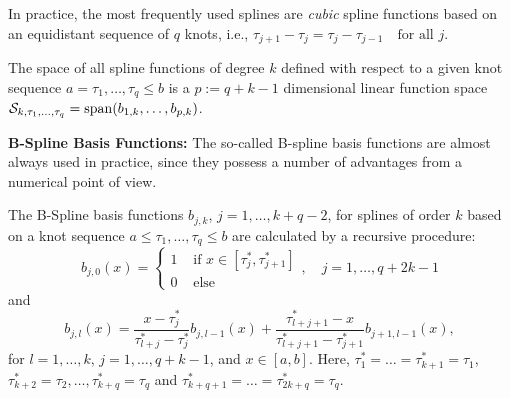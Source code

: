 \documentclass[14pt]{extreport}\usepackage[]{graphicx}\usepackage[]{xcolor}
\begin{document}
\bigskip

In practice, the most frequently used splines are \emph{cubic} spline functions based on an equidistant sequence of $q$ knots, i.e.,
$\tau_{j+1}-\tau_j=\tau_j-\tau_{j-1}\quad\text{for all } j$.

\bigskip

The space of all spline functions of degree $k$ defined with respect to a given knot sequence
$a=\tau_1,\dots,\tau_q\le b$ is a $p:=q+k-1$ dimensional linear function space
${\cal{S}}_{k,\tau_1,\dots,\tau_q}=\operatorname{span}(b_{1,k},\dots,b_{p,k})$.

% 
% 

\bigskip

\textbf{B-Spline Basis Functions:} The so-called B-spline basis functions are almost always used in practice, since they possess a number of advantages from a numerical point of view.

\bigskip

The B-Spline basis functions $b_{j,k}$, $j=1,\dots,k+q-2$, for splines of order $k$ based on a knot sequence $a\le \tau_1,\dots,\tau_q\le b$
  are calculated by a recursive procedure:
$$b_{j,0}(x)=\left\{ \begin{matrix}  1 & \text{ if } x\in[\tau_{j}^*,\tau_{j+1}^*]\\
0 & \text{ else} \end{matrix}\right., \quad j=1,\dots,q+2k-1 $$
and
$$b_{j,l}(x)=\frac{x-\tau_j^*}{\tau_{l+j}^*-\tau_j^*}b_{j,l-1}(x)+
\frac{\tau_{l+j+1}^*-x}{\tau_{l+j+1}^*-\tau_{j+1}^*}b_{j+1,l-1}(x),
$$
for $l=1,\dots,k$, $j=1,\dots,q+k-1$, and $x\in [a,b]$. Here, $\tau_1^*=\dots=\tau_{k+1}^*=\tau_1$,
$\tau_{k+2}^*=\tau_2,\dots,\tau^*_{k+q}=\tau_q$ and $\tau_{k+q+1}^*=\dots=\tau_{2k+q}^*=\tau_q$.

\bigskip
\end{document}
